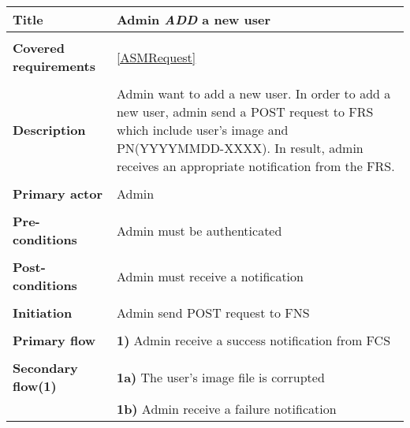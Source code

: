 \documentclass[a4paper,11pt]{article}
\begin{document}
\begin{tabular}{|p{3.5cm}|p{11.5cm}|} \hline
    \textbf{Title} &   Admin \emph{ADD} a new user
        
    \\ \hline \rowcolor{Gray} & \\ \hline
    
    \textbf{Covered requirements} &  \ref{ASMRequest}
    
    \\ \hline \rowcolor{Gray} & \\ \hline
    
    \textbf{Description} &  Admin want to add a new user. In order to add a new user, admin send a POST request to FRS which include user's image and PN(YYYYMMDD-XXXX). In result, admin receives an appropriate notification from the FRS.
        
    \\ \hline \rowcolor{Gray} & \\ \hline
        
    \textbf{Primary actor} & Admin  
        
    \\ \hline \rowcolor{Gray} & \\ \hline 
          
    \textbf{Pre-conditions} &   Admin must be authenticated
        
    \\ \hline \rowcolor{Gray} & \\ \hline
         
    \textbf{Post-conditions} &   Admin must receive a notification
        
    \\ \hline \rowcolor{Gray} & \\ \hline 
         
    \textbf{Initiation} & Admin send POST request to FNS
        
    \\ \hline \rowcolor{Gray} & \\ \hline 
         
    \textbf{Primary flow} &
    \textbf{1)} Admin receive a success notification from FCS
        
    \\ \hline \rowcolor{Gray} & \\ \hline 
         
    \textbf{Secondary flow(1)} & 
    \textbf{1a)} The user's image file is corrupted \\&
    \textbf{1b)} Admin receive a failure notification
     

\end{tabular}
\end{document}
